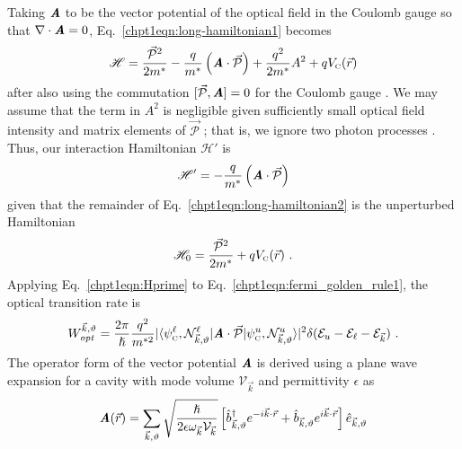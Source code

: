 \documentclass[12pt]{report}
\begin{document}
Taking $\textit{\textbf{A}}$ to be the vector potential of the optical field in the Coulomb gauge so that $\nabla\cdot \textit{\textbf{A}}=0$, Eq.~\eqref{chpt1eqn:long-hamiltonian1} becomes
\begin{equation}
\label{chpt1eqn:long-hamiltonian2}
\mathscr{H} = \frac{\vec{\mathcal{P}}^2}{2 m^*} -\frac{q}{m^*}\left(\textbf{\textit{A}} \cdot \vec{\mathcal{P}} \right) + \frac{q^2}{2 m^*} A^2 + q V_{\textnormal{\tiny{C}}}(\vec{r})
\end{equation}
after also using the commutation $[\vec{\mathcal{P}},\textit{\textbf{A}}]=0$ for the Coulomb gauge \cite{CohenTannoudji}.  We may assume that the term in $A^2$ is negligible given sufficiently small optical field intensity and matrix elements of $\vec{\mathcal{P}}$ \cite{Yariv:book:1989}; that is, we ignore two photon processes \cite{Parker:book:2005}.  Thus, our interaction Hamiltonian $\mathscr{H}'$ is
\begin{equation}
\label{chpt1eqn:Hprime}
\mathscr{H}'=-\frac{q}{m^*}\left(\textit{\textbf{A}} \cdot \vec{\mathcal{P}} \right)
\end{equation}
given that the remainder of Eq.~\eqref{chpt1eqn:long-hamiltonian2} is the unperturbed Hamiltonian
\begin{equation}
\mathscr{H}_0=\frac{\vec{\mathcal{P}}^2}{2 m^*} + q V_{\textnormal{\tiny{C}}}(\vec{r}) \textnormal{~.}
\end{equation}
Applying Eq.~\eqref{chpt1eqn:Hprime} to Eq.~\eqref{chpt1eqn:fermi_golden_rule1}, the optical transition rate is
\begin{equation}
\label{chpt1eqn:fermi_golden_rule2}
W_\textit{opt}^{\vec{k},\vartheta} = \frac{2 \pi}{\hslash} \frac{q^2}{m^{*2}} \vert\langle \psi_\tn{\tiny{C}}^\ell,\mathcal{N}^\ell_{\vec{k},\vartheta} \vert \textit{\textbf{A}} \cdot \vec{\mathcal{P}}
\vert \psi_\tn{\tiny{C}}^u,\mathcal{N}^u_{\vec{k},\vartheta}  \rangle\vert^2 \delta(\EE_u-\EE_\ell-\EE_{\vec{k}}) \tn{~.}
\end{equation}
The operator form of the vector potential $\textit{\textbf{A}}$ is derived using a plane wave expansion for a cavity with mode volume $\mathcal{V}_{\vec{k}}$ and permittivity $\epsilon$ as \cite{Parker:book:2005}
\begin{equation}
\textit{\textbf{A}}(\vec{r})=\sum_{\vec{k},\vartheta} \sqrt{\frac{\hslash}{2 \epsilon \omega_{\vec{k}} \mathcal{V}_{\vec{k}}}} \left[ \hat{b}^\dagger_{\vec{k},\vartheta} e^{-i \vec{k} \cdot \vec{r}} +  \hat{b}_{\vec{k},\vartheta} e^{i \vec{k} \cdot \vec{r}}\right]
\hat{e}_{\vec{k},\vartheta}
\end{equation}
\end{document}
